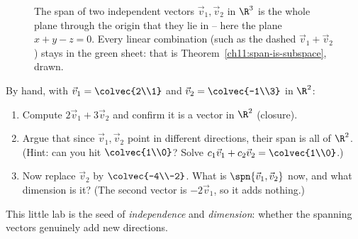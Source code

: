 \begin{figure}[H]
\centering
{}
\caption{The span of two independent vectors $\vec{v}_1,\vec{v}_2$ in $\R^3$ is the whole
plane through the origin that they lie in -- here the plane $x+y-z=0$. Every linear
combination (such as the dashed $\vec{v}_1+\vec{v}_2$) stays in the green sheet: that is
Theorem~\ref{ch11:span-is-subspace}, drawn.}
\label{ch11:fig-span-plane}
\end{figure}

\begin{labbox}
By hand, with $\vec{v}_1=\colvec{2\\1}$ and $\vec{v}_2=\colvec{-1\\3}$ in $\R^2$:
\begin{enumerate}
  \item Compute $2\vec{v}_1 + 3\vec{v}_2$ and confirm it is a vector in $\R^2$ (closure).
  \item Argue that since $\vec{v}_1,\vec{v}_2$ point in different directions, their span is
  all of $\R^2$. (Hint: can you hit $\colvec{1\\0}$? Solve
  $c_1\vec{v}_1+c_2\vec{v}_2=\colvec{1\\0}$.)
  \item Now replace $\vec{v}_2$ by $\colvec{-4\\-2}$. What is $\spn\{\vec{v}_1,\vec{v}_2\}$
  now, and what dimension is it? (The second vector is $-2\vec{v}_1$, so it adds nothing.)
\end{enumerate}
This little lab is the seed of \emph{independence} and \emph{dimension}: whether the
spanning vectors genuinely add new directions.
\end{labbox}

